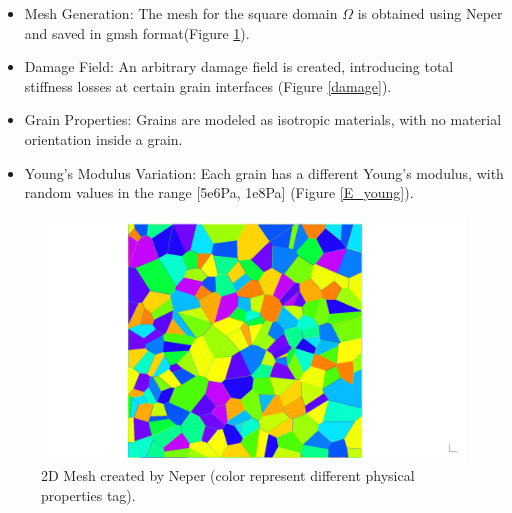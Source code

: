 \documentclass[12pt]{article}
\begin{document}
\begin{itemize}
	
\item Mesh Generation: The mesh for the square domain $\Omega$ is obtained using Neper and saved in  gmsh format(Figure \ref{mesh}).
\item Damage Field:  An arbitrary damage field is created, introducing total stiffness losses at certain grain interfaces (Figure \ref{damage}).
\item Grain Properties: Grains are modeled as isotropic materials, with no material orientation inside a grain.
\item Young's Modulus Variation: Each grain has a different Young's modulus, with random values in the range [5e6Pa, 1e8Pa] (Figure \ref{E_young}).
\end{itemize}
\begin{figure}
	\includegraphics[width=1.\textwidth]{neper.png}
	\caption{2D Mesh created by Neper (color represent different physical properties tag). \label{mesh}}
\end{figure}
\end{document}
